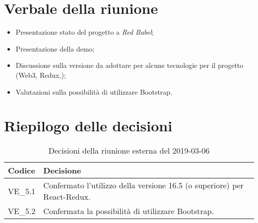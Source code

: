 \section{Verbale della riunione}
\begin{itemize}
	\item Presentazione stato del progetto a \textit{Red Babel};
	\item Presentazione della demo;
	\item Discussione sulla versione da adottare per alcune tecnologie per il 
	progetto (Web3, Redux,);
	\item Valutazioni sulla possibilità di utilizzare Bootstrap.

\end{itemize}

\hspace{3cm}

\section{Riepilogo delle decisioni}

	
	\begin{longtable}{ >{\centering}p{} >{}p{}}
		\caption{Decisioni della riunione esterna del 2019-03-06}\\	
		\rowcolorhead
		\textbf{\color{white}Codice} 
		& \centering\textbf{\color{white}Decisione} 
		\tabularnewline 
		\endfirsthead
		VE\_5.1 & Confermato l'utilizzo della versione 16.5 (o superiore) per 
		React-Redux.
		\tabularnewline
		VE\_5.2 & Confermata la possibilità di utilizzare Bootstrap.
		
		
		
		
	\end{longtable}
	




